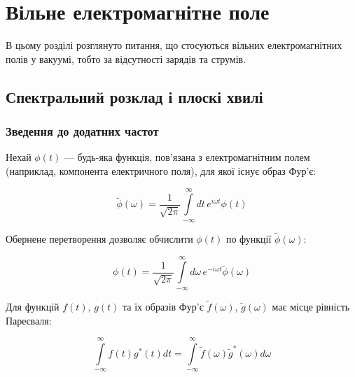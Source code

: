 
\chapter{Вільне електромагнітне поле}\label{\currfilebase}


В цьому розділі розглянуто питання, що стосуються вільних електромагнітних полів у вакуумі, тобто за відсутності зарядів та струмів.


\section{Спектральний розклад і плоскі хвилі}\label{sec:spectral}


\subsection*{Зведення до додатних частот}

Нехай $\phi(t)$ --- будь-яка функція, пов’язана з електромагнітним полем (наприклад, компонента електричного поля), для якої існує образ Фур’є:

\begin{equation}
\tilde{\phi}(\omega) = \frac{1}{\sqrt{2\pi}} \int\limits_{-\infty}^{\infty} dt \, e^{i\omega t} \phi(t)
\label{eq:fourier_transform}
\end{equation}

Обернене перетворення дозволяє обчислити $\phi(t)$ по функції $\tilde{\phi}(\omega)$:

\begin{equation}
\phi(t) = \frac{1}{\sqrt{2\pi}} \int\limits_{-\infty}^{\infty} d\omega \, e^{-i\omega t} \tilde{\phi}(\omega)
\label{eq:inverse_fourier_transform}
\end{equation}

Для функцій $f(t)$, $g(t)$ та їх образів Фур’є $\tilde{f}(\omega)$, $\tilde{g}(\omega)$ має місце рівність Пареєваля:

\begin{equation}
\int\limits_{-\infty}^{\infty} f(t)g^{*}(t)dt = \int\limits_{-\infty}^{\infty} \tilde{f}(\omega)\tilde{g}^{*}(\omega)d\omega
\label{eq:parseval}
\end{equation}

